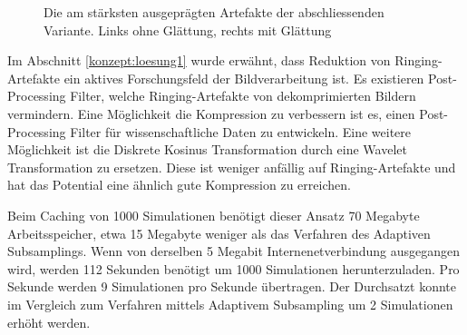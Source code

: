\begin{figure}[!htbp]
	\center
	\caption{Die am stärksten ausgeprägten Artefakte der abschliessenden Variante. Links ohne Glättung, rechts mit Glättung}
	\label{resultate:loesung1:dct:final:artefakte}
\end{figure}
Im Abschnitt \ref{konzept:loesung1} wurde erwähnt, dass Reduktion von Ringing-Artefakte ein aktives Forschungsfeld der Bildverarbeitung ist. Es existieren Post-Processing Filter, welche Ringing-Artefakte von dekomprimierten Bildern vermindern. Eine Möglichkeit die Kompression zu verbessern ist es, einen Post-Processing Filter für wissenschaftliche Daten zu entwickeln. Eine weitere Möglichkeit ist die Diskrete Kosinus Transformation durch eine Wavelet Transformation zu ersetzen. Diese ist weniger anfällig auf Ringing-Artefakte und hat das Potential eine ähnlich gute Kompression zu erreichen.

Beim Caching von 1000 Simulationen benötigt dieser Ansatz 70 Megabyte Arbeitsspeicher, etwa 15 Megabyte weniger als das Verfahren des Adaptiven Subsamplings. Wenn von derselben 5 Megabit Internenetverbindung ausgegangen wird, werden 112 Sekunden benötigt um 1000 Simulationen herunterzuladen. Pro Sekunde werden 9 Simulationen pro Sekunde übertragen. Der Durchsatzt konnte im Vergleich zum Verfahren mittels Adaptivem Subsampling um 2 Simulationen erhöht werden.

